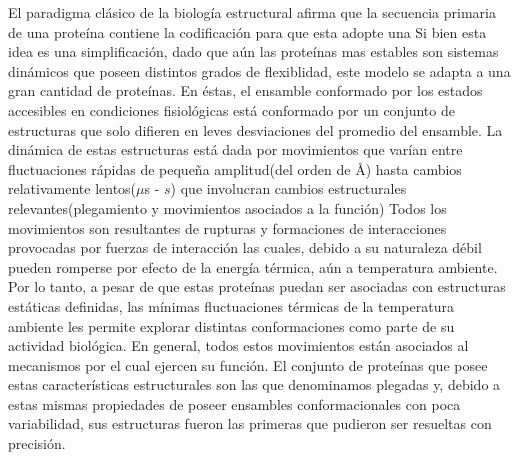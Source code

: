 El paradigma clásico de la biología estructural afirma que la secuencia primaria de una proteína contiene la codificación para que esta adopte una 
Si bien esta idea es una simplificación, dado que aún las proteínas mas estables son sistemas dinámicos que poseen distintos grados de flexiblidad, este modelo se adapta a una gran cantidad de proteínas.
En éstas, el ensamble conformado por los estados accesibles en condiciones fisiológicas está conformado por un conjunto de estructuras que solo difieren en leves desviaciones del promedio del ensamble.
La dinámica de estas estructuras está dada por movimientos que varían entre fluctuaciones rápidas de pequeña amplitud(del orden de \AA) hasta cambios relativamente lentos($\mu$s - $s$) que involucran cambios estructurales relevantes(plegamiento y movimientos asociados a la función)
Todos los movimientos son resultantes de rupturas y formaciones de interacciones provocadas por fuerzas de interacción las cuales, debido a su naturaleza débil pueden romperse por efecto de la energía térmica, aún a temperatura ambiente.
Por lo tanto, a pesar de que estas proteínas puedan ser asociadas con estructuras estáticas definidas, las mínimas fluctuaciones térmicas de la temperatura ambiente les permite explorar distintas conformaciones como parte de su actividad biológica.
En general, todos estos movimientos están asociados al mecanismos por el cual ejercen su función.
El conjunto de proteínas que posee estas características estructurales son las que denominamos plegadas y, debido a estas mismas propiedades de poseer ensambles conformacionales con poca variabilidad, sus estructuras fueron las primeras que pudieron ser resueltas con precisión. 


